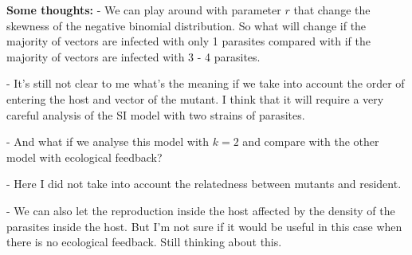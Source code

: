 \documentclass{article}
\begin{document}
\textbf{Some thoughts:} 
- We can play around with parameter $r$ that change the skewness of the negative binomial distribution. So what will change if the majority of vectors are infected with only 1 parasites compared with if the majority of vectors are infected with 3 - 4 parasites.

- It's still not clear to me what's the meaning if we take into account the order of entering the host and vector of the mutant. I think that it will require a very careful analysis of the SI model with two strains of parasites. 

- And what if we analyse this model with $k = 2$ and compare with the other model with ecological feedback?

- Here I did not take into account the relatedness between mutants and resident. 

- We can also let the reproduction inside the host affected by the density of the parasites inside the host. But I'm not sure if it would be useful in this case when there is no ecological feedback. Still thinking about this.
\end{document}
